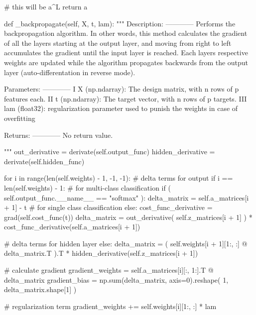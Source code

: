 \documentclass[%
oneside,                 %
final,                   %
10pt]{article}
\begin{document}
        # this will be a^L
        return a

    def _backpropagate(self, X, t, lam):
        """
        Description:
        ------------
            Performs the backpropagation algorithm. In other words, this method
            calculates the gradient of all the layers starting at the
            output layer, and moving from right to left accumulates the gradient until
            the input layer is reached. Each layers respective weights are updated while
            the algorithm propagates backwards from the output layer (auto-differentation in reverse mode).

        Parameters:
        ------------
            I   X (np.ndarray): The design matrix, with n rows of p features each.
            II  t (np.ndarray): The target vector, with n rows of p targets.
            III lam (float32): regularization parameter used to punish the weights in case of overfitting

        Returns:
        ------------
            No return value.

        """
        out_derivative = derivate(self.output_func)
        hidden_derivative = derivate(self.hidden_func)

        for i in range(len(self.weights) - 1, -1, -1):
            # delta terms for output
            if i == len(self.weights) - 1:
                # for multi-class classification
                if (
                    self.output_func.__name__ == "softmax"
                ):
                    delta_matrix = self.a_matrices[i + 1] - t
                # for single class classification
                else:
                    cost_func_derivative = grad(self.cost_func(t))
                    delta_matrix = out_derivative(
                        self.z_matrices[i + 1]
                    ) * cost_func_derivative(self.a_matrices[i + 1])

            # delta terms for hidden layer
            else:
                delta_matrix = (
                    self.weights[i + 1][1:, :] @ delta_matrix.T
                ).T * hidden_derivative(self.z_matrices[i + 1])

            # calculate gradient
            gradient_weights = self.a_matrices[i][:, 1:].T @ delta_matrix
            gradient_bias = np.sum(delta_matrix, axis=0).reshape(
                1, delta_matrix.shape[1]
            )

            # regularization term
            gradient_weights += self.weights[i][1:, :] * lam
\end{document}
